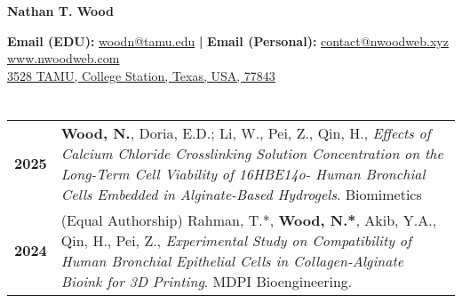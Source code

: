 \documentclass[11pt]{article}
\makeatletter
\def \fullname{Nathan T. Wood}
\def \mail {\href{mailto:woodn@tamu.edu}{woodn@tamu.edu}}
\def \mailalt {\href{mailto:contact@nwoodweb.xyz}{contact@nwoodweb.xyz}}
\def \website {\href{www.nwoodweb.com}{www.nwoodweb.com}}
\def \address {\href{https://www.bio.tamu.edu/}
{3528 TAMU, College Station, Texas, USA, 77843}}
\makeatother
\begin{document}
\begin{center}
	\huge{\textcolor{primary}{\textbf{\fullname}} \\}
\end{center}

\begin{center}
        \small{
                \textbf{Email (EDU):} {{{\mail}} \textbf{|}} 
                \textbf{Email (Personal):} {\mailalt}	 \\ 
                \website \\ 
                \address 
        }
        \color{secondary}{
                \rule{\textwidth}{.2em}
        }
\end{center}
\section*{\color{secondary}{First Author Publications}}

        \begin{tabularx}{\textwidth}{lX}
		\textbf{2025} & {\textbf{Wood, N.}, Doria, E.D.; Li, W.,
		Pei, Z., Qin, H., \emph{Effects of Calcium Chloride 
		Crosslinking Solution Concentration on the Long-Term
		Cell Viability of 16HBE14o- Human Bronchial Cells
		Embedded in Alginate-Based Hydrogels}. Biomimetics} \\ 

		\textbf{2024} & {(Equal Authorship)
                        Rahman, T.*, \textbf{Wood, N.*}, Akib, Y.A.,
                        Qin, H., Pei, Z., \emph{Experimental Study
                        on Compatibility of Human Bronchial 
                        Epithelial Cells in Collagen-Alginate Bioink 
			for 3D Printing}. MDPI Bioengineering.} \\ 
	\end{tabularx}
\end{document}
